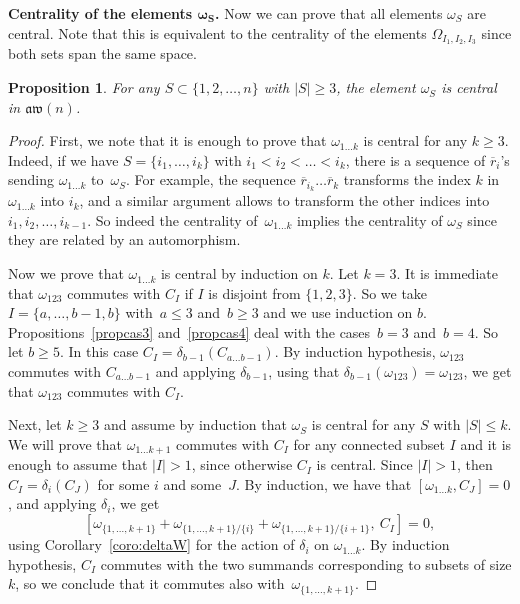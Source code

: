 \documentclass[pdftex]{sigma}
\numberwithin{equation}{section}
\newtheorem{prop}[theo]{Proposition}
\theoremstyle{definition}
\newcommand{\rb}{\overline{r}}
\newcommand{\aw}{\mathfrak{aw}(n)}
\begin{document}
{\bf Centrality of the elements $\boldsymbol{\omega_S}$.} Now we can prove that all elements $\omega_S$ are central. Note that this is equivalent to the centrality of the elements $\varOmega_{I_1,I_2,I_3}$ since both sets span the same space.
\begin{prop}
 For any $S\subset\{1,2,\dots ,n\}$ with $|S|\geq3$, the element $\omega_{S}$ is central in $\aw$.
\end{prop}
\begin{proof}
First, we note that it is enough to prove that $\omega_{1\dots k}$ is central for any $k\geq 3$. Indeed, if we have $S=\{i_1,\dots,i_k\}$ with $i_1<i_2<\dots <i_k$, there is a sequence of $\rb_i$'s sending $\omega_{1\dots k}$ to~$\omega_S$. For example, the sequence $\rb_{i_k}\dots\rb_{k}$ transforms the index $k$ in $\omega_{1\dots k}$ into $i_k$, and a similar argument allows to transform the other indices into $i_1,i_2,\dots,i_{k-1}$. So indeed the centrality of~$\omega_{1\dots k}$ implies the centrality of $\omega_S$ since they are related by an automorphism.

Now we prove that $\omega_{1\dots k}$ is central by induction on $k$. Let $k=3$. It is immediate that $\omega_{123}$ commutes with $C_I$ if $I$ is disjoint from $\{1,2,3\}$. So we take $I=\{a,\dots, b-1, b\}$ with~$a\leq 3$ and~$b\geq 3$ and we use induction on $b$. Propositions~\ref{propcas3} and~\ref{propcas4} deal with the cases~$b=3$ and~$b=4$. So let $b\geq 5$. In this case $C_I=\delta_{b-1}(C_{a\dots b-1})$. By induction hypothesis, $\omega_{123}$ commutes with $C_{a\dots b-1}$ and applying $\delta_{b-1}$, using that $\delta_{b-1}(\omega_{123})=\omega_{123}$, we get that $\omega_{123}$ commutes with $C_I$.

Next, let $k\geq 3$ and assume by induction that $\omega_S$ is central for any $S$ with $|S|\leq k$. We will prove that $\omega_{1\dots k+1}$ commutes with $C_I$ for any connected subset $I$ and it is enough to assume that $|I|>1$, since otherwise $C_I$ is central. Since $|I|>1$, then $C_I=\delta_i(C_J)$ for some $i$ and some~$J$. By induction, we have that $[\omega_{1\dots k},C_J]=0$, and applying $\delta_i$, we get
\[[\omega_{\{1,\dots, k+1\}}+\omega_{\{1,\dots, k+1\}/\{i\}}+\omega_{\{1,\dots, k+1\}/\{i+1\}} ,\ C_I]=0 ,\]
using Corollary~\ref{coro:deltaW} for the action of $\delta_i$ on $\omega_{1\dots k}$. By induction hypothesis, $C_I$ commutes with the two summands corresponding to subsets of size $k$, so we conclude that it commutes also with~$\omega_{\{1,\dots, k+1\}}$.
\end{proof}
\end{document}
